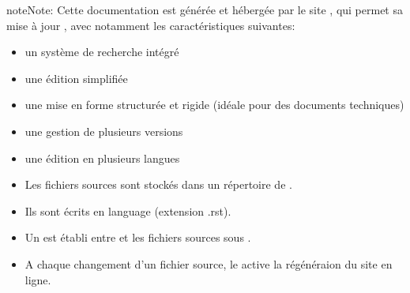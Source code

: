 \documentclass[letterpaper,10pt,french]{sphinxmanual}
\begin{document}
\begin{sphinxadmonition}{note}{Note:}
Cette documentation est générée et hébergée par le site {\hyperref[\detokenize{readthedocs/glossary:term-read-the-docs}]{}}, qui permet sa mise à jour , avec notamment les caractéristiques suivantes:
\begin{itemize}
\item {} 
un système de recherche intégré

\item {} 
une édition simplifiée

\item {} 
une mise en forme structurée et rigide (idéale pour des documents techniques)

\item {} 
une gestion de plusieurs versions

\item {} 
une édition en plusieurs langues

\end{itemize}
\end{sphinxadmonition}
\begin{itemize}
\item {} 
Les fichiers sources sont stockés dans un répertoire de {\hyperref[\detokenize{readthedocs/glossary:term-github}]{}}.

\item {} 
Ils sont écrits en language {\hyperref[\detokenize{readthedocs/glossary:term-rst}]{}} (extension .rst).

\item {} 
Un {\hyperref[\detokenize{readthedocs/glossary:term-webhook}]{}} est établi entre {\hyperref[\detokenize{readthedocs/glossary:term-read-the-docs}]{}} et les fichiers sources sous {\hyperref[\detokenize{readthedocs/glossary:term-github}]{}}.

\item {} 
A chaque changement d’un fichier source, le {\hyperref[\detokenize{readthedocs/glossary:term-webhook}]{}} active la régénéraion du site en ligne.

\end{itemize}
\end{document}
